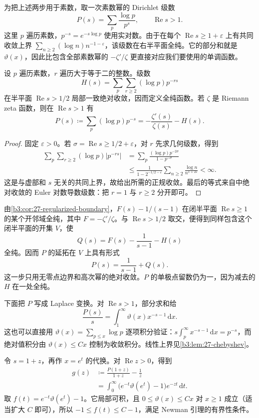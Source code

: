 为把上述两步用于素数，取一次素数幂的 Dirichlet 级数
\[
 P(s)=\sum_p\frac{\log p}{p^s},\qquad \operatorname{Re}s>1.
\]
这里 \(p\) 遍历素数，\(p^{-s}=e^{-s\log p}\) 使用实对数。由于在每个 \(\operatorname{Re}s\ge1+\varepsilon\) 上有共同收敛上界 \(\sum_{n\ge2}(\log n)n^{-1-\varepsilon}\)，该级数在右半平面全纯。它的部分和就是 \(\vartheta(x)\)，因此比包含全部素数幂的 \(-\zeta'/\zeta\) 更直接对应我们要使用的单调函数。

\begin{proposition}[高次素数幂项的延拓范围]\label{b3:prop:27-prime-power-tail}
设 \(p\) 遍历素数，\(r\) 遍历大于等于二的整数。级数
\[
 H(s)=\sum_p\sum_{r\ge2}(\log p)p^{-rs}
\]
在半平面 \(\operatorname{Re}s>1/2\) 局部一致绝对收敛，因而定义全纯函数。若 \(\zeta\) 是 Riemann zeta 函数，则在 \(\operatorname{Re}s>1\) 有
\[
 P(s)\coloneqq\sum_p(\log p)p^{-s}
      =-\frac{\zeta'(s)}{\zeta(s)}-H(s).
\]
\end{proposition}
\begin{proof}
固定 \(\varepsilon>0\)。若 \(\sigma=\operatorname{Re}s\ge1/2+\varepsilon\)，对 \(r\) 先求几何级数，得到
\[
 \begin{aligned}
 \sum_p\sum_{r\ge2}(\log p)|p^{-rs}|
 &=\sum_p\frac{(\log p)p^{-2\sigma}}{1-p^{-\sigma}}\\
 &\le\frac1{1-2^{-1/2-\varepsilon}}
       \sum_{n\ge2}\frac{\log n}{n^{1+2\varepsilon}}
 <\infty.
 \end{aligned}
\]
这是与虚部和 \(s\) 无关的共同上界，故给出所需的正规收敛。最后的等式来自中绝对收敛的 Euler 对数导数级数：把 \(r=1\) 与 \(r\ge2\) 分开即可。
\end{proof}

由\cref{b3:cor:27-regularized-boundary}，\(F(s)-1/(s-1)\) 在闭半平面 \(\operatorname{Re}s\ge1\) 的某个开邻域全纯，其中 \(F=-\zeta'/\zeta\)。与 \(\operatorname{Re}s>1/2\) 取交，便得到同样包含这个闭半平面的开集 \(V\)，使
\[
 Q(s)=F(s)-\frac1{s-1}-H(s)
\]
全纯。因而 \(P\) 的延拓在 \(V\) 上具有形式
\[
 P(s)=\frac1{s-1}+Q(s).
\]
这一步只用无零点边界和高次幂的绝对收敛。\(P\) 的单极点留数仍为一，因为减去的 \(H\) 在一处全纯。

下面把 \(P\) 写成 Laplace 变换。对 \(\operatorname{Re}s>1\)，部分求和给
\[
 \frac{P(s)}s=\int_1^\infty\vartheta(x)x^{-s-1}\,\mathrm dx.
\]
这也可以直接用 \(\vartheta(x)=\sum_{p\le x}\log p\) 逐项积分验证：\(s\int_p^\infty x^{-s-1}\,\mathrm dx=p^{-s}\)，而绝对值积分由 \(\vartheta(x)\le Cx\) 控制为收敛积分。线性上界见\cref{b3:lem:27-chebyshev}。

令 \(s=1+z\)，再作 \(x=e^t\) 的代换。对 \(\operatorname{Re}z>0\)，得到
\begin{equation}\label{b3:eq:27-newman-boundary-function}
 \begin{aligned}
 g(z)&\coloneqq\frac{P(1+z)}{1+z}-\frac1z\\
 &=\int_0^\infty\bigl(e^{-t}\vartheta(e^t)-1\bigr)
                   e^{-zt}\,\mathrm dt.
 \end{aligned}
\end{equation}
取 \(f(t)=e^{-t}\vartheta(e^t)-1\)。它局部可积，且 \(0\le\vartheta(x)\le Cx\) 对 \(x\ge1\) 成立（适当扩大 \(C\) 即可），所以 \(-1\le f(t)\le C-1\)，满足 Newman 引理的有界性条件。

